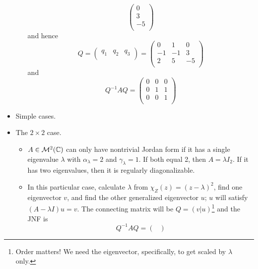 \documentclass[../notes.tex]{subfiles}
\begin{document}
\begin{itemize}
\begin{itemize}
\begin{equation*}
\begin{pmatrix}
                0\\
                3\\
                -5\\
            \end{pmatrix}
        \end{equation*}
        and hence
        \begin{equation*}
            Q =
            \begin{pmatrix}
                q_1 & q_2 & q_3\\
            \end{pmatrix}
            =
            \begin{pmatrix}
                0 & 1 & 0\\
                -1 & -1 & 3\\
                2 & 5 & -5\\
            \end{pmatrix}
        \end{equation*}
        and
        \begin{equation*}
            Q^{-1}AQ =
            \begin{pmatrix}
                0 & 0 & 0\\
                0 & 1 & 1\\
                0 & 0 & 1\\
            \end{pmatrix}
        \end{equation*}
    \end{itemize}
    \item Simple cases.
    \item The $2\times 2$ case.
    \begin{itemize}
        \item $A\in\mathcal{M}^2(\mathbb{C})$ can only have nontrivial Jordan form if it has a single eigenvalue $\lambda$ with $\alpha_\lambda=2$ and $\gamma_\lambda=1$. If both equal 2, then $A=\lambda I_2$. If it has two eigenvalues, then it is regularly diagonalizable.
        \item In this particular case, calculate $\lambda$ from $\chi_Z(z)=(z-\lambda)^2$, find one eigenvector $v$, and find the other generalized eigenvector $u$; $u$ will satisfy $(A-\lambda I)u=v$. The connecting matrix will be $Q=(v|u)$\footnote{Order matters! We need the eigenvector, specifically, to get scaled by $\lambda$ only.} and the JNF is
        \begin{equation*}
            Q^{-1}AQ =
            \begin{pmatrix}

\end{pmatrix}
\end{equation*}
\end{itemize}
\end{itemize}
\end{document}
